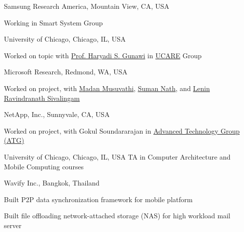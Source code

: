 \documentclass[10pt]{article} %
\begin{document}
{Samsung Research America, Mountain View, CA, USA}
{\begin{minipage}{\smallertextwidth}
Working in Smart System Group
\end{minipage}}

{University of Chicago, Chicago, IL, USA}
{\begin{minipage}{\smallertextwidth}
Worked on  topic
with \href{http://ucare.cs.uchicago.edu/}{Prof. Haryadi S. Gunawi}
in \href{http://ucare.cs.uchicago.edu/}{UCARE} Group
\end{minipage}} 

{Microsoft Research, Redmond, WA, USA}
{\begin{minipage}{\smallertextwidth}
Worked on  project,
with \href{https://www.microsoft.com/en-us/research/people/madanm/}{Madan Musuvathi}, 
\href{https://www.microsoft.com/en-us/research/people/sumann/}{Suman Nath}, 
and \href{http://people.csail.mit.edu/lenin/}{Lenin Ravindranath Sivalingam}
\end{minipage}} 


{NetApp, Inc., Sunnyvale, CA, USA}
{\begin{minipage}{\smallertextwidth}
Worked on  project, 
with Gokul Soundararajan
in \href{http://www.netapp.com/us/company/leadership/advanced-technology/}{Advanced Technology Group (ATG)} 
\end{minipage}}

{University of Chicago, Chicago, IL, USA}
{TA in Computer Architecture and Mobile Computing courses} 

{Wavify Inc., Bangkok, Thailand}
{\begin{minipage}{\smallertextwidth}
\begin{itemize-noindent}
\setlength\itemsep{-1ex}
\item Built P2P data synchronization framework for mobile platform
\item Built file offloading network-attached storage (NAS) for high workload mail server
\end{itemize-noindent}
\end{minipage}}
\end{document}
